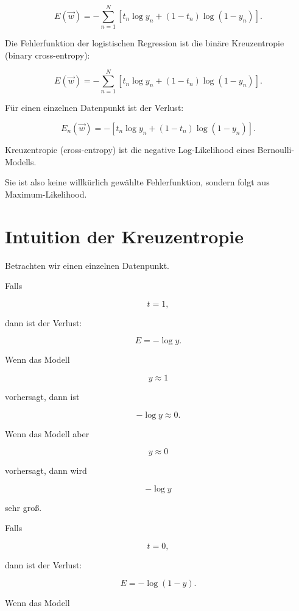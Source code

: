 \[
    E(\vec{w})
    =
    -\sum_{n=1}^{N}
    \left[
        t_n\log y_n
        +
        (1-t_n)\log(1-y_n)
    \right].
\]

\begin{definitionbox}
Die Fehlerfunktion der logistischen Regression ist die binäre Kreuzentropie (binary cross-entropy):

\[
    E(\vec{w})
    =
    -\sum_{n=1}^{N}
    \left[
        t_n\log y_n
        +
        (1-t_n)\log(1-y_n)
    \right].
\]
\end{definitionbox}

Für einen einzelnen Datenpunkt ist der Verlust:

\[
    E_n(\vec{w})
    =
    -\left[
        t_n\log y_n
        +
        (1-t_n)\log(1-y_n)
    \right].
\]

\begin{conceptbox}
Kreuzentropie (cross-entropy) ist die negative Log-Likelihood eines Bernoulli-Modells.

Sie ist also keine willkürlich gewählte Fehlerfunktion, sondern folgt aus Maximum-Likelihood.
\end{conceptbox}

\section{Intuition der Kreuzentropie}

Betrachten wir einen einzelnen Datenpunkt.

Falls

\[
    t=1,
\]

dann ist der Verlust:

\[
    E
    =
    -\log y.
\]

Wenn das Modell

\[
    y\approx 1
\]

vorhersagt, dann ist

\[
    -\log y \approx 0.
\]

Wenn das Modell aber

\[
    y\approx 0
\]

vorhersagt, dann wird

\[
    -\log y
\]

sehr groß.

Falls

\[
    t=0,
\]

dann ist der Verlust:

\[
    E
    =
    -\log(1-y).
\]

Wenn das Modell

